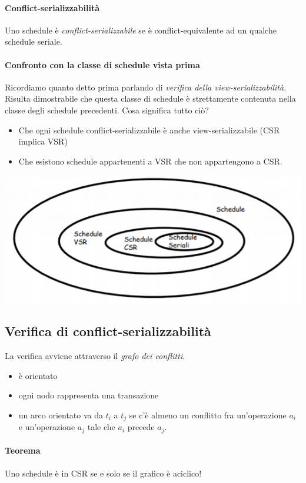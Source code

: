 \paragraph{Conflict-serializzabilità} Uno schedule è \emph{conflict-serializzabile} se è conflict-equivalente ad un qualche schedule seriale.
\paragraph{Confronto con la classe di schedule vista prima} Ricordiamo quanto detto prima parlando di \emph{verifica della view-serializzabilità}. Risulta dimostrabile che questa classe di schedule è strettamente contenuta nella classe degli schedule precedenti. Cosa significa tutto ciò?
\begin{itemize}
	\item Che ogni schedule conflict-serializzabile è anche view-serializzabile (CSR implica VSR)
	\item Che esistono schedule appartenenti a VSR che non appartengono a CSR.
\end{itemize}
\begin{center}\includegraphics{images/159.PNG}\end{center}
\subsection{Verifica di conflict-serializzabilità} 
La verifica avviene attraverso il \emph{grafo dei conflitti}.
\begin{itemize}
	\item è orientato
	\item ogni nodo rappresenta una transazione
	\item un arco orientato va da $t_i$ a $t_j$ se c'è almeno un conflitto fra un'operazione $a_i$ e un'operazione $a_j$ tale che $a_i$ precede $a_j$.
\end{itemize}
\paragraph{Teorema} Uno schedule è in CSR se e solo se il grafico è aciclico!
